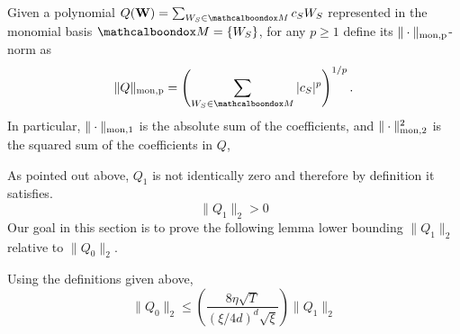 \begin{definition}\label{def-monp-norm}
	Given a polynomial $Q({\bf W}) = \sum_{W_S \in \mcb{M}} c_SW_S$ represented in the monomial basis $\mcb{M} = \{W_S\}$, for any $p \ge 1$ define its $\|\cdot\|_{\rm mon,p}$-norm as  
\begin{equation*}
\|Q\|_{\rm mon,p} = \left(\sum_{W_S \in \mcb{M}} |c_S|^p\right)^{1/p}.
\end{equation*}
	In particular, $\|\cdot\|_{\rm mon,1}$ is the absolute sum of the coefficients, and $\|\cdot\|^2_{\rm mon,2}$ is the squared sum of the coefficients in $Q$,
\end{definition}










As pointed out above, $Q_1$ is not identically zero and therefore by definition it satisfies.
\begin{equation}			\label{eq:Q1-nonzero}
	\|Q_1\|_2 > 0
\end{equation}
Our goal in this section is to prove the following lemma lower bounding $\|Q_1\|_2$ relative to $\|Q_0\|_2$.
\begin{lemma}					\label{lem:Q1-lowerBound}
Using the definitions given above,
\begin{equation}
\|Q_0\|_2 \leq \left(\frac{8\eta\sqrt{T}}{(\xi/4d)^{d}\sqrt{\xi}}\right)  \|Q_1\|_2
\end{equation}
\end{lemma}

